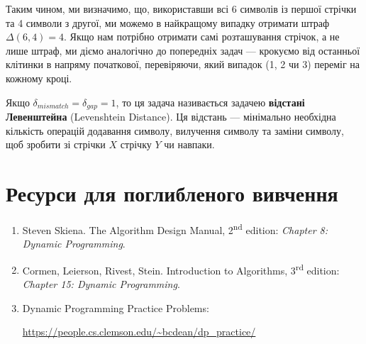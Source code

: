 \documentclass[12pt,a4paper]{report}
\begin{document}
Таким чином, ми визначимо, що, використавши всі 6 символів із першої стрічки та 4 символи з другої, ми можемо в найкращому випадку отримати штраф \(\Delta(6, 4) = 4\).
Якщо нам потрібно отримати самі розташування стрічок, а не лише штраф, ми діємо аналогічно до попередніх задач --- крокуємо від останньої клітинки в напряму початкової, перевіряючи, який випадок (1, 2 чи 3) переміг на кожному кроці.

Якщо \(\delta_{mismatch} = \delta_{gap} = 1\), то ця задача називається задачею \textbf{відстані Левенштейна} (Levenshtein Distance). Ця відстань --- мінімально необхідна кількість операцій додавання символу, вилучення символу та заміни символу, щоб зробити зі стрічки \(X\) стрічку \(Y\) чи навпаки.



\section*{Ресурси для поглибленого вивчення}
\begin{enumerate}
    \item Steven Skiena. The Algorithm Design Manual, 2\textsuperscript{nd} edition: {\itshape Chapter 8: Dynamic Programming}.
    \item Cormen, Leierson, Rivest, Stein. Introduction to Algorithms, 3\textsuperscript{rd} edition: {\itshape Chapter 15: Dynamic Programming}.
    \item Dynamic Programming Practice Problems:

          \href{https://people.cs.clemson.edu/~bcdean/dp_practice/}{https://people.cs.clemson.edu/\textasciitilde bcdean/dp\_practice/}
\end{enumerate}
\end{document}
